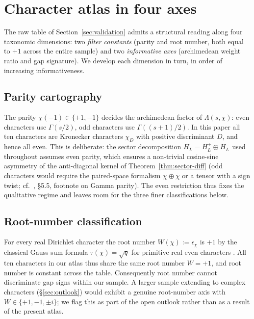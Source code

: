 \documentclass[a4paper,10pt,twocolumn]{article}
\theoremstyle{definition}
\theoremstyle{remark}
\newcommand{\chifn}{\chi}
\begin{document}
\section{Character atlas in four axes}
\label{sec:atlas}

The raw table of Section~\ref{sec:validation} admits a structural
reading along four taxonomic dimensions: two \emph{filter constants}
(parity and root number, both equal to $+1$ across the entire sample)
and two \emph{informative axes} (archimedean weight ratio and gap
signature). We develop each dimension in turn, in order of increasing
informativeness.

\subsection{Parity cartography}
\label{sec:parity}

The parity $\chifn(-1)\in\{+1,-1\}$ decides the archimedean factor of
$\Lambda(s,\chifn)$: even characters use $\Gamma(s/2)$, odd
characters use $\Gamma((s+1)/2)$. In this paper all ten characters
are Kronecker characters $\chifn_D$ with positive discriminant $D$, and
hence all even. This is deliberate: the sector decomposition
$H_L=H_L^+\oplus H_L^-$ used throughout assumes even parity, which
ensures a non-trivial cosine-sine asymmetry of the anti-diagonal
kernel of Theorem~\ref{thm:sector-diff} (odd characters would
require the paired-space formalism
$\chifn\oplus\bar\chifn$ or a tensor with a sign twist; cf.\
\cite{MetaGalerkinBridge}, \S5.5, footnote on Gamma parity). The
even restriction thus fixes the qualitative regime and leaves room
for the three finer classifications below.

\subsection{Root-number classification}
\label{sec:rootnumber}

For every real Dirichlet character the root number $W(\chifn):=
\epsilon_{\chifn}$ is $+1$ by the classical Gauss-sum formula
$\tau(\chifn)=\sqrt{q}$ for primitive real even characters
\cite{IwaniecKowalski}. All ten characters in our atlas thus share the
same root number $W=+1$, and root number is constant across the
table. Consequently root number cannot discriminate gap signs
within our sample. A larger sample extending to complex
characters (\S\ref{sec:outlook}) would exhibit a genuine root-number
axis with $W\in\{+1,-1,\pm i\}$; we flag this as part of the open
outlook rather than as a result of the present atlas.
\end{document}

